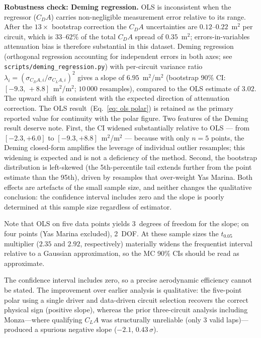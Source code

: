 \textbf{Robustness check: Deming regression.} OLS is inconsistent when the regressor ($C_DA$) carries non-negligible measurement error relative to its range. After the $13\times$ bootstrap correction the $C_DA$ uncertainties are $0.12$--$0.22$~m$^2$ per circuit, which is $33$--$62\%$ of the total $C_DA$ spread of $0.35$~m$^2$; errors-in-variables attenuation bias is therefore substantial in this dataset. Deming regression (orthogonal regression accounting for independent errors in both axes; see \texttt{scripts/deming\_regression.py}) with per-circuit variance ratio $\lambda_i = (\sigma_{C_DA,i}/\sigma_{C_LA,i})^2$ gives a slope of $6.95$~m$^2$/m$^2$ (bootstrap 90\% CI: $[-9.3,\, +8.8]$~m$^2$/m$^2$; $10\,000$ resamples), compared to the OLS estimate of $3.02$. The upward shift is consistent with the expected direction of attenuation correction. The OLS result~(Eq.~\ref{eq: ols polar}) is retained as the primary reported value for continuity with the polar figure. Two features of the Deming result deserve note. First, the CI widened substantially relative to OLS --- from $[-2.3, +6.0]$ to $[-9.3, +8.8]$~m$^2$/m$^2$ --- because with only $n=5$ points, the Deming closed-form amplifies the leverage of individual outlier resamples; this widening is expected and is not a deficiency of the method. Second, the bootstrap distribution is left-skewed (the 5th-percentile tail extends further from the point estimate than the 95th), driven by resamples that over-weight Yas Marina. Both effects are artefacts of the small sample size, and neither changes the qualitative conclusion: the confidence interval includes zero and the slope is poorly determined at this sample size regardless of estimator.

Note that OLS on five data points yields 3~degrees of freedom for the slope; on four points (Yas Marina excluded), 2~DOF. At these sample sizes the $t_{0.05}$ multiplier ($2.35$ and $2.92$, respectively) materially widens the frequentist interval relative to a Gaussian approximation, so the MC 90\% CIs should be read as approximate.

The confidence interval includes zero, so a precise aerodynamic efficiency cannot be stated. The improvement over earlier analysis is qualitative: the five-point polar using a single driver and data-driven circuit selection recovers the correct physical sign (positive slope), whereas the prior three-circuit analysis including Monza---where qualifying $C_LA$ was structurally unreliable (only 3 valid laps)---produced a spurious negative slope ($-2.1$, $0.43\,\sigma$).

